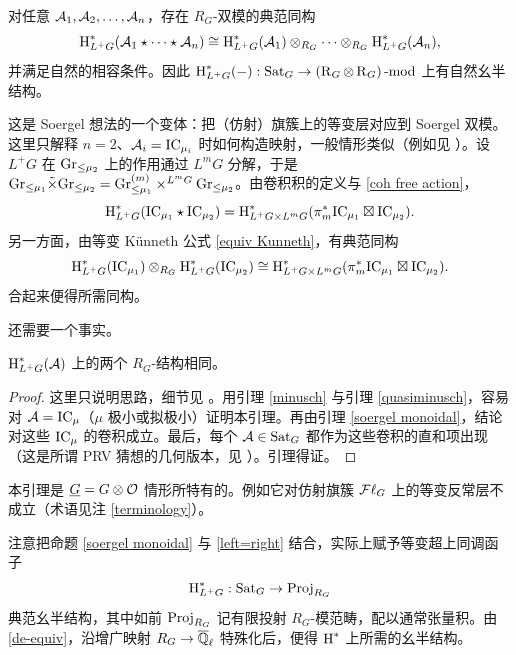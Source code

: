 \begin{lem}\label{soergel monoidal}
对任意 ${\mathcal A}_1,{\mathcal A}_2,\ldots,{\mathcal A}_n$，存在 $R_{G}$-双模的典范同构
\[\operatorname{H}^*_{L^+G}({\mathcal A}_1\star\cdots\star{\mathcal A}_n)\cong \operatorname{H}^*_{L^+G}({\mathcal A}_1)\otimes_{R_{G}}\cdots\otimes_{R_{G}}\operatorname{H}^*_{L^+G}({\mathcal A}_n),\]
并满足自然的相容条件。因此 $\operatorname{H}^*_{L^+G}(-):{\operatorname{Sat}}_G\to (\operatorname{R}_{G}\otimes\operatorname{R}_{G})\operatorname{-mod}$ 上有自然幺半结构。
\end{lem}

这是 Soergel 想法的一个变体：把（仿射）旗簇上的等变层对应到 Soergel 双模。这里只解释 $n=2$、${\mathcal A}_i={\operatorname{IC}}_{\mu_i}$ 时如何构造映射，一般情形类似（例如见 \cite[\S~2.3]{Z14}）。设 $L^+G$ 在 ${\operatorname{Gr}}_{\leq \mu_2}$ 上的作用通过 $L^mG$ 分解，于是 ${\operatorname{Gr}}_{\leq \mu_1}\tilde\times{\operatorname{Gr}}_{\leq \mu_2}= {\operatorname{Gr}}_{\leq\mu_1}^{(m)}\times^{L^mG}{\operatorname{Gr}}_{\leq \mu_2}$。由卷积积的定义与 \eqref{coh free action}，
\[\operatorname{H}^*_{L^+G}({\operatorname{IC}}_{\mu_1}\star{\operatorname{IC}}_{\mu_2})=\operatorname{H}^*_{L^+G\times L^mG}(\pi_m^*{\operatorname{IC}}_{\mu_1}\boxtimes {\operatorname{IC}}_{\mu_2}).\]
另一方面，由等变 K\"unneth 公式 \eqref{equiv Kunneth}，有典范同构
\[\operatorname{H}^*_{L^+G}({\operatorname{IC}}_{\mu_1})\otimes_{R_{G}} \operatorname{H}^*_{L^+G}({\operatorname{IC}}_{\mu_2})\cong \operatorname{H}^*_{L^+G\times L^mG}(\pi_m^*{\operatorname{IC}}_{\mu_1}\boxtimes {\operatorname{IC}}_{\mu_2}).\]
合起来便得所需同构。

还需要一个事实。

\begin{lem}\label{left=right}
$\operatorname{H}^*_{L^+G}({\mathcal A})$ 上的两个 $R_{G}$-结构相同。
\end{lem}

\begin{proof}
这里只说明思路，细节见 \cite[\S\ 2.3]{Z14}。用引理 \ref{minusch} 与引理 \ref{quasiminusch}，容易对 ${\mathcal A}={\operatorname{IC}}_\mu$（$\mu$ 极小或拟极小）证明本引理。再由引理 \ref{soergel monoidal}，结论对这些 ${\operatorname{IC}}_\mu$ 的卷积成立。最后，每个 ${\mathcal A}\in{\operatorname{Sat}}_G$ 都作为这些卷积的直和项出现（这是所谓 PRV 猜想的几何版本，见 \cite[Proposition 9.6]{NP}）。引理得证。
\end{proof}

\begin{rmk}
本引理是 $\underline G=G\otimes {\mathcal O}$ 情形所特有的。例如它对仿射旗簇 ${{\mathcal F}\ell}_G$ 上的等变反常层不成立（术语见注 \ref{terminology}）。
\end{rmk}

注意把命题 \ref{soergel monoidal} 与 \ref{left=right} 结合，实际上赋予等变超上同调函子
\[\operatorname{H}^*_{L^+G}: {\operatorname{Sat}}_G\to \operatorname{Proj}_{R_G}\]
典范幺半结构，其中如前 $\operatorname{Proj}_{R_G}$ 记有限投射 $R_G$-模范畴，配以通常张量积。由 \eqref{de-equiv}，沿增广映射 $R_{G}\to {\overline{{\mathbb Q}}_\ell}$ 特殊化后，便得 $\operatorname{H}^*$ 上所需的幺半结构。

